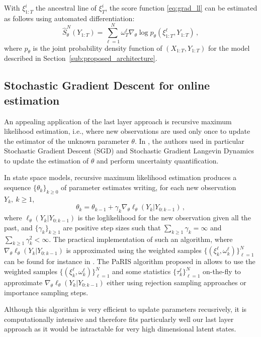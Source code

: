 \documentclass[conference]{IEEEtran}
\begin{document}
With $\xi^i_{1:T}$ the ancestral line of $\xi^i_{T}$, the score function \eqref{eq:grad_ll} can be estimated as follows using automated differentiation:
$$
	\widehat {S}^N_\theta(Y_{1:T}) = \sum_{\ell=1}^N \omega_T^\ell\nabla_\theta\log p_\theta(\xi^\ell_{1:T}, Y_{1:T})\,,
$$
where $p_\theta$ is the joint probability density function of $(X_{1:T}, Y_{1:T})$ for the model described in Section~\ref{sub:proposed_architecture}.


\subsection{Stochastic Gradient Descent for online estimation}
An appealing application of the last layer approach is recursive maximum likelihood estimation, i.e., where new observations are used only once to update the estimator of the unknown parameter $\theta$. In \cite{Brosse2020OnLA}, the authors used in particular Stochastic Gradient Descent (SGD) and Stochastic Gradient Langevin Dynamics to update the estimation of $\theta$ and perform uncertainty quantification.

In state space models, recursive maximum likelihood estimation produces a sequence $\lbrace\theta_k\rbrace_{k\geq 0}$ of parameter estimates writing, for each new observation $Y_{k},~k\geq 1$,
$$
	\theta_{k} = \theta_{k-1} + \gamma_k \nabla_\theta \ell_{\theta}(Y_k | Y_{0:k - 1}) \,,
$$
where $\ell_{\theta}(Y_k | Y_{0:k - 1})$ is the loglikelihood for the new observation given all the past, and $\lbrace\gamma_k\rbrace_{k\geq 1}$ are positive step sizes such that $\sum_{k \geq 1}\gamma_k = \infty$ and $\sum_{k \geq 1}\gamma_k^2 < \infty$. The practical implementation of such an algorithm, where $\nabla_\theta\ell_{\theta}(Y_k | Y_{0:k - 1})$ is approximated using the weighted samples $\{(\xi^{\ell}_k,\omega^{\ell}_k)\}_{\ell=1}^N$ can be found for instance in \cite{gloaguen2022pseudo}. The PaRIS algorithm proposed in \cite{Olsson2014EfficientPO} allows to use the weighted samples $\{(\xi^{\ell}_k,\omega^{\ell}_k)\}_{\ell=1}^N$ and some statistics $\{\tau^{\ell}_k\}_{\ell=1}^N$ on-the-fly to approximate $\nabla_\theta \ell_{\theta}(Y_k | Y_{0:k - 1})$ either using rejection sampling approaches or importance sampling steps.

Although this algorithm is very efficient to update parameters recusrively, it is computationally intensive and therefore fits particularly well our last layer approach as it would be intractable for very high dimensional latent states.
\end{document}
